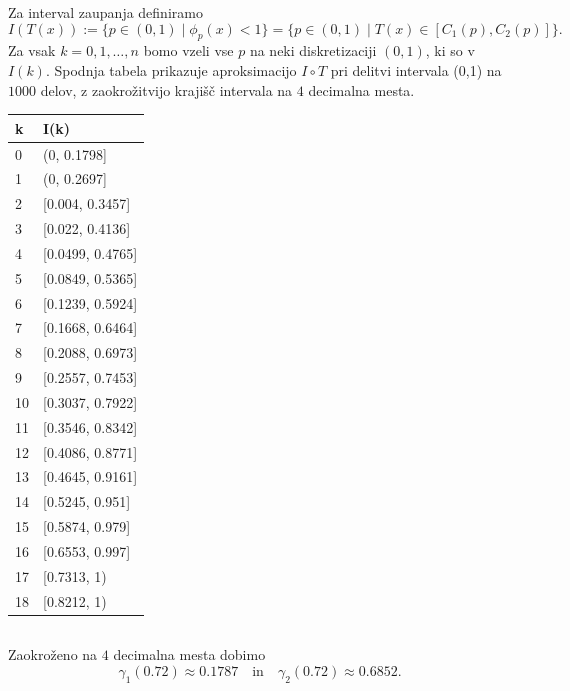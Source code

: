 \documentclass[ letterpaper, titlepage, fleqn]{article}
\begin{document}
Za interval zaupanja definiramo
$$I(T(x)) := \{p \in (0,1) \mid \phi_p(x) < 1\} = \{p \in (0,1) \mid T(x) \in [C_1(p), C_2(p)]\}.$$
Za vsak $k=0,1,\dots,n$ bomo vzeli vse $p$ na neki diskretizaciji $(0,1)$, ki so v $I(k)$. Spodnja tabela prikazuje aproksimacijo $I\circ T$ pri delitvi intervala (0,1) na $1000$ delov, z zaokrožitvijo krajišč intervala na $4$ decimalna mesta.

\begin{center}
\begin{tabular}{ l | l }
k & I(k) \\
\hline
0 & (0, 0.1798] \\
1 & (0, 0.2697] \\
2 & [0.004, 0.3457] \\
3 & [0.022, 0.4136] \\
4 & [0.0499, 0.4765] \\
5 & [0.0849, 0.5365] \\
6 & [0.1239, 0.5924] \\
7 & [0.1668, 0.6464] \\
8 & [0.2088, 0.6973] \\
9 & [0.2557, 0.7453] \\
10 & [0.3037, 0.7922] \\
11 & [0.3546, 0.8342] \\
12 & [0.4086, 0.8771] \\
13 & [0.4645, 0.9161] \\
14 & [0.5245, 0.951] \\
15 & [0.5874, 0.979] \\
16 & [0.6553, 0.997] \\
17 & [0.7313, 1) \\
18 & [0.8212, 1) \\
\end{tabular}
\end{center}

\subsection{}
Zaokroženo na $4$ decimalna mesta dobimo
$$\gamma_1(0.72) \approx 0.1787 \quad \text{in} \quad \gamma_2(0.72) \approx 0.6852.$$
\end{document}

